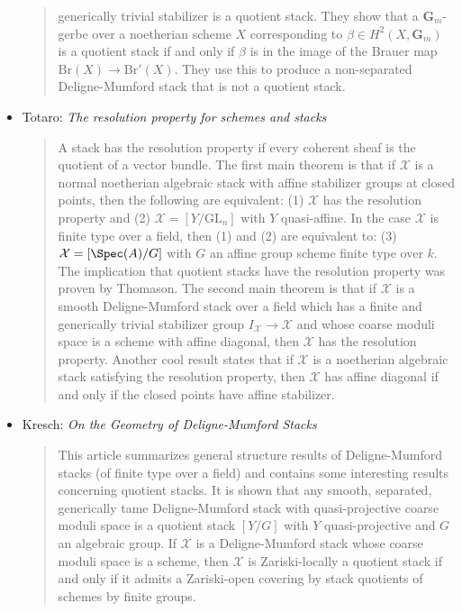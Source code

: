 \begin{itemize}
\begin{quote}
generically trivial stabilizer is a quotient stack.
They show that a $\mathbf{G}_m$-gerbe over a noetherian scheme $X$
corresponding to
$\beta \in H^2(X, \mathbf{G}_m)$ is a quotient stack if and only if $\beta$ is
in the
image of the Brauer map $\text{Br}(X) \to \text{Br}'(X)$. They use this to
produce a
non-separated Deligne-Mumford stack that is not a quotient stack.
\end{quote}
\item Totaro: \emph{The resolution property for schemes and stacks}
\cite{totaro_resolution}
\begin{quote}
A stack has the resolution property if every coherent sheaf is the quotient of
a vector bundle. The first main theorem is that if $\mathcal{X}$ is a normal
noetherian algebraic stack with affine stabilizer groups at closed points, then
the following are equivalent: (1) $\mathcal{X}$ has the resolution property and
(2)
$\mathcal{X} = [Y/\text{GL}_n]$ with $Y$ quasi-affine. In the case
$\mathcal{X}$ is finite type over
a field, then (1) and (2) are equivalent to: (3)
$\mathcal{X} = [\Spec(A)/G]$ with $G$
an affine group scheme finite type over $k$. The implication that quotient
stacks have the resolution property was proven by Thomason.
The second main theorem is that if $\mathcal{X}$ is a smooth Deligne-Mumford
stack over
a field which has a finite and generically trivial stabilizer group
$I_\mathcal{X}
\to \mathcal{X}$ and whose coarse moduli space is a scheme with affine
diagonal, then
$\mathcal{X}$ has the resolution property. Another cool result states that if
$\mathcal{X}$ is
a noetherian algebraic stack satisfying the resolution property, then
$\mathcal{X}$ has
affine diagonal if and only if the closed points have affine stabilizer.
\end{quote}
\item Kresch: \emph{On the Geometry of Deligne-Mumford Stacks}
\cite{kresch_geometry}
\begin{quote}
This article summarizes general structure results of Deligne-Mumford
stacks (of finite type over a field) and contains some interesting results
concerning quotient stacks. It is shown that any smooth, separated,
generically tame Deligne-Mumford stack with quasi-projective coarse moduli
space is a quotient stack $[Y/G]$ with $Y$ quasi-projective and $G$ an
algebraic group. If $\mathcal{X}$ is a Deligne-Mumford stack whose coarse
moduli space
is a scheme, then $\mathcal{X}$ is Zariski-locally a quotient stack if and only
if it
admits a Zariski-open covering by stack quotients of schemes by finite groups.

\end{quote}
\end{itemize}
